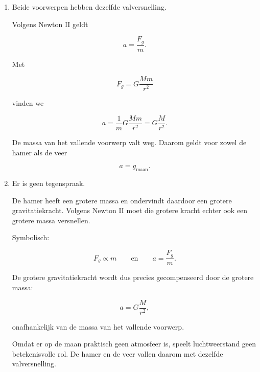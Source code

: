 \documentclass{ximera}
\begin{document}
\begin{oefening}{\oefU\ESS}
\begin{oplossing}
\begin{enumerate}
      
      \item
      Beide voorwerpen hebben dezelfde valversnelling.
      
      Volgens Newton II geldt
      
      \[
      a=\frac{F_g}{m}.
      \]
      
      Met
      
      \[
      F_g
      =
      G\frac{Mm}{r^2}
      \]
      
      vinden we
      
      \[
      a
      =
      \frac{1}{m}
      G\frac{Mm}{r^2}
      =
      G\frac{M}{r^2}.
      \]
      
      De massa van het vallende voorwerp valt weg. Daarom geldt voor zowel
      de hamer als de veer
      
      \[
      \boxed{
      a=g_{\mathrm{maan}}.
      }
      \]
      
      
      \item
      Er is geen tegenspraak.
      
      De hamer heeft een grotere massa en ondervindt daardoor een grotere
      gravitatiekracht. Volgens Newton II moet die grotere kracht echter
      ook een grotere massa versnellen.
      
      Symbolisch:
      
      \[
      F_g\propto m
      \qquad\text{en}\qquad
      a=\frac{F_g}{m}.
      \]
      
      De grotere gravitatiekracht wordt dus precies gecompenseerd door de
      grotere massa:
      
      \[
      \boxed{
      a
      =
      G\frac{M}{r^2},
      }
      \]
      
      onafhankelijk van de massa van het vallende voorwerp.
      
      Omdat er op de maan praktisch geen atmosfeer is, speelt
      luchtweerstand geen betekenisvolle rol. De hamer en de veer vallen
      daarom met dezelfde valversnelling.
      
      \end{enumerate}
      
      \end{oplossing}


\end{oefening}

\end{document}
